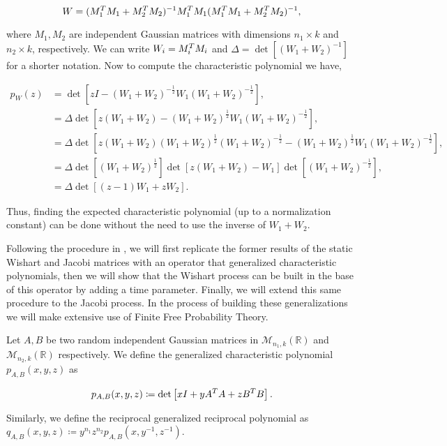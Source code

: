 \begin{equation*}
    W = (M_1^TM_1 + M_2^TM_2)^{-1}M_1^TM_1(M_1^TM_1 + M_2^TM_2)^{-1},
\end{equation*}

\noindent where $M_1, M_2$ are independent Gaussian matrices with dimensions $n_1\times k$ and $n_2 \times k$, respectively.  We can write $W_i = M_i^TM_i$ and $\Delta=\det\left[(W_1+W_2)^{-1}\right]$ for a shorter notation. Now to compute the characteristic polynomial we have,

\begin{align*}
    p_W(z) &= \det\left[ zI - (W_1+W_2)^{-\frac12}W_1(W_1+W_2)^{-\frac12} \right], \\ 
    &= \Delta\det\left[ z(W_1+W_2) - (W_1+W_2)^{\frac12}W_1(W_1+W_2)^{-\frac12} \right],\\ 
    &= \Delta\det\left[ z(W_1+W_2)(W_1+W_2)^{\frac12}(W_1+W_2)^{-\frac12} - (W_1+W_2)^{\frac12}W_1(W_1+W_2)^{-\frac12} \right], \\
    &= \Delta\det\left[(W_1+W_2)^{\frac12}\right]\det\left[ z(W_1 + W_2) - W_1\right]\det\left[(W_1+W_2)^{-\frac12}\right],\\ 
    &= \Delta\det\left[ (z-1)W_1 + zW_2 \right].
\end{align*}

Thus, finding the expected characteristic polynomial (up to a normalization constant) can be done without the need to use the inverse of $W_1 + W_2$.



Following the procedure in \cite{article:marcus_finite_free_point_processes}, we will first replicate the former results of the static Wishart and Jacobi matrices with an operator that generalized characteristic polynomials, then we will show that the Wishart process can be built in the base of this operator by adding a time parameter. Finally, we will extend this same procedure to the Jacobi process. In the process of building these generalizations we will make extensive use of Finite Free Probability Theory.

\begin{definition}
    Let $A, B$ be two random independent Gaussian matrices in $\mathcal M_{n_1,k}(\mathbb R)$ and $\mathcal M_{n_2,k}(\mathbb R)$ respectively. We define the generalized characteristic polynomial $p_{A,B}(x,y,z)$ as

    \begin{equation*}
        p_{A,B}(x,y,z) \coloneqq \det\left[ xI + y A^TA + z B^TB \right].
    \end{equation*}

    Similarly, we define the reciprocal generalized reciprocal polynomial as $q_{A,B}(x,y,z) \coloneqq y^{n_1}z^{n_2}p_{A,B}(x,y^{-1},z^{-1})$.
\end{definition}

